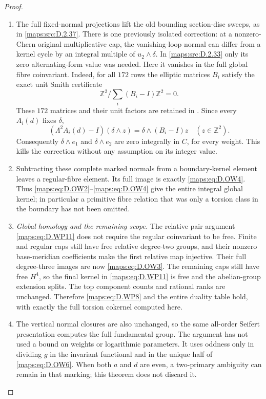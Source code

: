 \begin{proof}
\begin{enumerate}[label=\arabic*.,leftmargin=*]
\item The full fixed-normal projections lift the old
bounding section-disc sweeps, as in \ref{maps:src:D.2.37}.
There is one previously isolated correction:
at a nonzero-Chern original multiplicative cap,
the vanishing-loop normal can differ from a
kernel cycle by an integral multiple of
$u_2\wedge\delta$. In \ref{maps:src:D.2.33} only its zero
alternating-form value was needed. Here it
vanishes in the full global fibre coinvariant.
Indeed, for all $172$ rows the elliptic matrices
$B_i$ satisfy the exact unit Smith certificate
\[
       \mathbb Z^2/\sum_i(B_i-I)\mathbb Z^2=0.             \tag{D.OW7}\label{maps:eq:D.OW7}
\]
These $172$ matrices and their unit factors
are retained in
.
Since every $A_i(d)$ fixes $\delta$,
\[
 (\Lambda^2A_i(d)-I)(\delta\wedge z)
                 =\delta\wedge(B_i-I)z
       \quad(z\in\mathbb Z^2).
\]
Consequently $\delta\wedge e_1$ and
$\delta\wedge e_2$ are zero integrally in $C$,
for every weight. This kills the correction
without any assumption on its integer value.

\item Subtracting these complete marked normals
from a boundary-kernel element leaves a
regular-fibre element. Its full image is
exactly \eqref{maps:eq:D.OW4}. Thus \eqref{maps:eq:D.OW2}--\eqref{maps:eq:D.OW4}
give the entire integral global kernel;
in particular a primitive fibre relation
that was only a torsion class in the boundary
has not been omitted.

\item \emph{Global homology and the remaining scope.}
The relative pair argument \eqref{maps:eq:D.WP11} does not
require the regular coinvariant to be free.
Finite and regular caps still have free
relative degree-two groups, and their
nonzero base-meridian coefficients make the
first relative map injective. Their full
degree-three images are now \eqref{maps:eq:D.OW3}.
The remaining caps still have free
$H^4$, so the final kernel in \eqref{maps:eq:D.WP11} is
free and the abelian-group extension splits.
The top component counts and rational ranks
are unchanged. Therefore \eqref{maps:eq:D.WP8} and the
entire duality table hold, with exactly the
full torsion cokernel computed here.

\item The vertical normal closures are also unchanged,
so the same all-order Seifert presentation
computes the full fundamental group.
The argument has not used a bound on weights
or logarithmic parameters. It uses oddness
only in dividing $g$ in the invariant functional
and in the unique half of \eqref{maps:eq:D.OW6}. When both
$a$ and $d$ are even, a two-primary ambiguity
can remain in that marking; this theorem
does not discard it.
\end{enumerate}
\end{proof}

